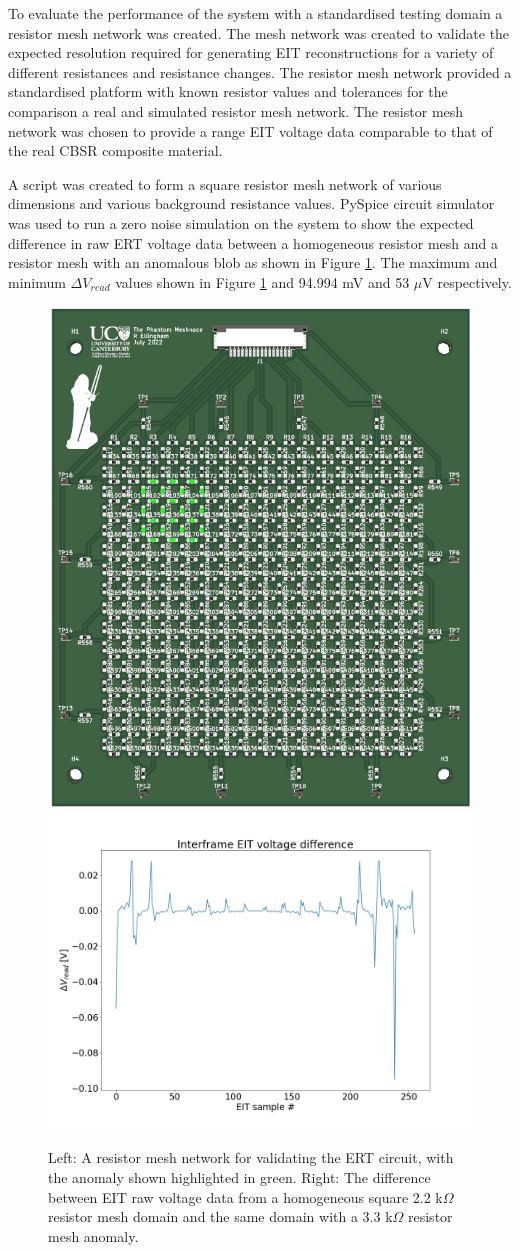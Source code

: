 To evaluate the performance of the system with a standardised testing domain a resistor mesh network was created. The mesh network was created to validate the expected resolution required for generating EIT reconstructions \cite{Ellingham2022} for a variety of different resistances and resistance changes. The resistor mesh network provided a standardised platform with known resistor values and tolerances for the comparison a real and simulated resistor mesh network. The resistor mesh network was chosen to provide a range EIT voltage data comparable to that of the real CBSR composite material.

A script was created to form a square resistor mesh network of various dimensions and various background resistance values. PySpice circuit simulator \cite{PySpice2021} was used to run a zero noise simulation on the system to show the expected difference in raw ERT voltage data between a homogeneous resistor mesh and a resistor mesh with an anomalous blob as shown in Figure \ref{fig:vdiff_res_mesh}. The maximum and minimum $\Delta V_{read}$ values shown in Figure \ref{fig:vdiff_res_mesh} and 94.994 mV and 53 $\mu$V respectively.
\begin{figure}[H]
\centering
\includegraphics[width=0.3\linewidth]{Figures/res_mesh_pcb.png}
\hspace{1cm}
\includegraphics[width=0.5\linewidth]{Figures/EIT_Vdiff_res_mesh_2k2bg_3k3anom.png} %
\caption{Left: A resistor mesh network for validating the ERT circuit, with the anomaly shown highlighted in green. Right: The difference between EIT raw voltage data from a homogeneous square 2.2 k$\Omega$ resistor mesh domain and the same domain with a 3.3 k$\Omega$ resistor mesh anomaly.}
\label{fig:vdiff_res_mesh}
\end{figure}

